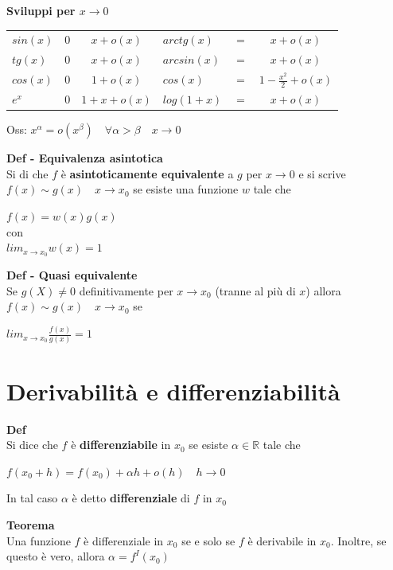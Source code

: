 \documentclass[12pt, a4paper]{article}
\begin{document}
    \textbf{Sviluppi per $x\to 0$}
    \begin{center}
        \begin{tabular}{l c c | l c c}
            $sin(x)$ & $0$ & $x+o(x)$   & $arctg(x)$  & $=$ & $x+o(x)$                 \\
            $tg(x)$  & $0$ & $x+o(x)$   & $arcsin(x)$ & $=$ & $x+o(x)$                 \\
            $cos(x)$ & $0$ & $1+o(x)$   & $cos(x)$    & $=$ & $1-\frac{x^{2}}{2}+o(x)$ \\
            $e^{x}$  & $0$ & $1+x+o(x)$ & $log(1+x)$  & $=$ & $x+o(x)$
        \end{tabular}
    \end{center}

    Oss: $x^{\alpha}=o(x^{\beta})\quad \forall \alpha>\beta\quad x\to 0$

    \textbf{Def - Equivalenza asintotica}\\Si di che $f$ è \textbf{asintoticamente equivalente} a $g$ per $x\to 0$
    e si scrive $f(x)\sim g(x)\quad x\to x_{0}$ se esiste una funzione $w$ tale che
    \begin{center}
        $f(x)=w(x)g(x)$\\
        con\\
        $lim_{x\to x_{0}}w(x)=1$
    \end{center}

    \textbf{Def - Quasi equivalente}\\ Se $g(X)\neq 0$ definitivamente per $x\to x_{0}$ (tranne al più di $x$) allora
$f(x)\sim g(x)\quad x\to x_{0}$ se
    \begin{center}
        $lim_{x\to x_{0}}\frac{f(x)}{g(x)}=1$
    \end{center}

    \newpage
    \section{Derivabilità e differenziabilità}
    \textbf{Def}\\Si dice che $f$ è \textbf{differenziabile} in $x_{0}$ se esiste $\alpha\in\mathbb{R}$ tale che
    \begin{center}
        $f(x_{0}+h)=f(x_{0})+\alpha h+o(h)\quad h\to 0$
    \end{center}
    In tal caso $\alpha$ è detto \textbf{differenziale} di $f$ in $x_{0}$

    \textbf{Teorema}\\Una funzione $f$ è differenziale in $x_{0}$ se e solo se $f$ è derivabile in $x_{0}$. Inoltre,
    se questo è vero, allora $\alpha=f^{I}(x_{0})$
\end{document}

